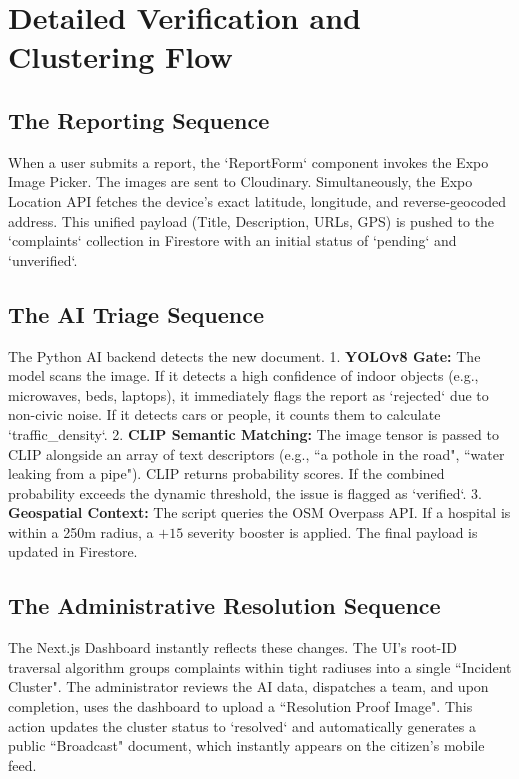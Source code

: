 \documentclass[12pt,a4paper]{report}
\begin{document}

\section{Detailed Verification and Clustering Flow}
\subsection{The Reporting Sequence}
When a user submits a report, the `ReportForm` component invokes the Expo Image Picker. The images are sent to Cloudinary. Simultaneously, the Expo Location API fetches the device's exact latitude, longitude, and reverse-geocoded address. This unified payload (Title, Description, URLs, GPS) is pushed to the `complaints` collection in Firestore with an initial status of `pending` and `unverified`.

\subsection{The AI Triage Sequence}
The Python AI backend detects the new document. 
1. \textbf{YOLOv8 Gate:} The model scans the image. If it detects a high confidence of indoor objects (e.g., microwaves, beds, laptops), it immediately flags the report as `rejected` due to non-civic noise. If it detects cars or people, it counts them to calculate `traffic_density`.
2. \textbf{CLIP Semantic Matching:} The image tensor is passed to CLIP alongside an array of text descriptors (e.g., ``a pothole in the road", ``water leaking from a pipe"). CLIP returns probability scores. If the combined probability exceeds the dynamic threshold, the issue is flagged as `verified`.
3. \textbf{Geospatial Context:} The script queries the OSM Overpass API. If a hospital is within a 250m radius, a $+15$ severity booster is applied. The final payload is updated in Firestore.

\subsection{The Administrative Resolution Sequence}
The Next.js Dashboard instantly reflects these changes. The UI's root-ID traversal algorithm groups complaints within tight radiuses into a single ``Incident Cluster". The administrator reviews the AI data, dispatches a team, and upon completion, uses the dashboard to upload a ``Resolution Proof Image". This action updates the cluster status to `resolved` and automatically generates a public ``Broadcast" document, which instantly appears on the citizen's mobile feed.
\end{document}

